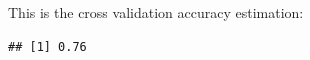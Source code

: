 \documentclass{article}\usepackage[]{graphicx}\usepackage[]{color}
\makeatletter
\newenvironment{kframe}{%
 \def\at@end@of@kframe{}%
 \ifinner\ifhmode%
  \def\at@end@of@kframe{\end{minipage}}%
  \begin{minipage}{\columnwidth}%
 \fi\fi%
 \def\FrameCommand##1{\hskip\@totalleftmargin \hskip-\fboxsep
 \colorbox{shadecolor}{##1}\hskip-\fboxsep
     \hskip-\linewidth \hskip-\@totalleftmargin \hskip\columnwidth}%
 \MakeFramed {\advance\hsize-\width
   \@totalleftmargin\z@ \linewidth\hsize
   \@setminipage}}%
 {\par\unskip\endMakeFramed%
 \at@end@of@kframe}
\newenvironment{knitrout}{}{} %
\makeatother
\begin{document}
This is the cross validation accuracy estimation:
\begin{knitrout}
\color{fgcolor}\begin{kframe}
\begin{verbatim}
## [1] 0.76
\end{verbatim}
\end{kframe}
\end{knitrout}








\end{document}

